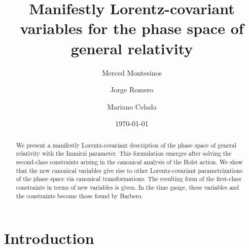 \documentclass[aps,prd,reprint,showpacs,longbibliography,superscriptaddress, groupedaddres,
titlepage,nofootinbib]{revtex4-1} %
\begin{document}
\title{Manifestly Lorentz-covariant variables for the phase space of general relativity}

\author{Merced Montesinos} 

\author{Jorge Romero}

\author{Mariano Celada}





\date{\today}

\begin{abstract}
	
	We present a manifestly Lorentz-covariant description of the phase space of general relativity with the Immirzi parameter. This formulation emerges after solving the second-class constraints arising in the canonical analysis of the Holst action. We show that the new canonical variables give rise to other Lorentz-covariant parametrizations of the phase space via canonical transformations. The resulting form of the first-class constraints in terms of new variables is given. In the time gauge, these variables and the constraints become those found by Barbero.
	

\end{abstract}


\maketitle


\section{Introduction} 
\end{document}
